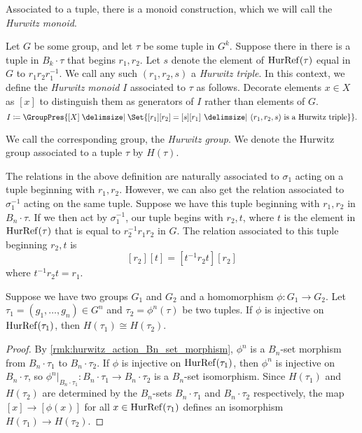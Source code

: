 Associated to a tuple, there is a monoid construction, which we will call the \emph{Hurwitz monoid}.
\begin{definition}
	\label{def:hurwitz_group}
	Let $G$ be some group, and let $\tau$ be some tuple  in $G^k$.
	Suppose there in there is a tuple in  $B_k \cdot \tau$ that begins $r_1,r_2$.
	Let $s$ denote the element of $\operatorname{HurRef}(\tau)$ equal in $G$ to  $r_1r_2r_1^{-1}$.
	We call any such $(r_1,r_2,s)$ a \emph{Hurwitz triple}.
	In this context, we define the \emph{Hurwitz monoid} $I$ associated to $\tau$ as follows.
	Decorate elements $x \in X$ as $[x]$ to distinguish them as generators of $I$ rather than elements of $G$.
	\[
		I \coloneq \GroupPres{[X] \relations \Set{ [r_1][r_2] = [s][r_1] \given (r_1,r_2,s) \text{ is a Hurwitz triple}}}
		.\]
\end{definition}
We call the corresponding group, the \emph{Hurwitz group}.
We denote the Hurwitz group associated to a tuple $\tau$ by  $H(\tau)$.

\begin{remark}
	The relations in the above definition are naturally associated to $\sigma_1$ acting on a tuple beginning with $r_1,r_2$.
	However, we can also get the relation associated to  $\sigma_1^{-1}$ acting on the same tuple.
	Suppose we have this tuple beginning with $r_1,r_2$ in $B_n \cdot \tau$.
	If we then act by  $\sigma_1^{-1}$, our tuple begins with $r_2,t$, where $t$ is the element in  $\operatorname{HurRef}(\tau)$ that is equal to  $r_2^{-1}r_1r_2$ in $G$.
	The relation associated to this tuple beginning $r_2,t$ is
	\[
		[r_2][t]=[t^{-1}r_2t][r_2]
	\]
	where $t^{-1}r_2t=r_1$.
\end{remark}

\begin{lemma}
	\label{lem:inj_on_hurref_implies_iso_hurwitz_group}
	Suppose we have two groups $G_1$ and $G_2$ and a homomorphism $\phi \colon G_1 \to G_2$.
	Let $\tau_1 = (g_1,\ldots,g_n) \in G^n$ and $\tau_2 = \phi^n(\tau)$ be two tuples.
	If $\phi$ is injective on $\operatorname{HurRef}(\tau_1)$, then  $H(\tau_1) \cong H(\tau_2)$.
\end{lemma}
\begin{proof}
	By \cref{rmk:hurwitz_action_Bn_set_morphism}, $\phi^n$ is a $B_n$-set morphism from  $B_n \cdot \tau_1$ to $B_n \cdot \tau_2$.
	If $\phi$ is injective on $\operatorname{HurRef}(\tau_1)$, then $\phi^n$ is injective on  $B_n \cdot \tau$, so  $\phi^n|_{B_n\cdot \tau_1} \colon B_n \cdot \tau_1 \to B_n \cdot \tau_2$ is a  $B_n$-set isomorphism.
	Since $H(\tau_1)$ and  $H(\tau_2)$ are determined by the  $B_n$-sets  $B_n \cdot \tau_1$ and $B_n \cdot \tau_2$ respectively, the map $[x] \to [\phi(x)]$ for all $x \in \operatorname{HurRef}(\tau_1)$ defines an isomorphism  $H(\tau_1) \to H(\tau_2)$.
\end{proof}


